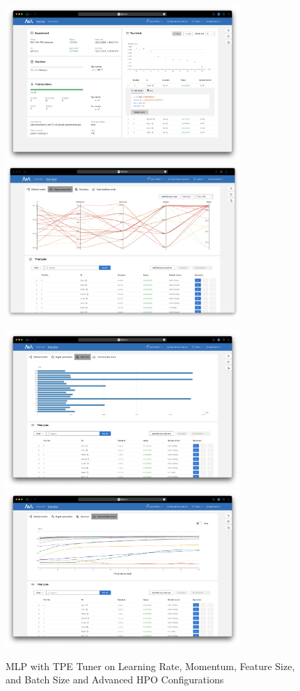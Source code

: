 \documentclass{article}
\begin{document}
\begin{figure}
	\centerline{\includegraphics[width=3.5in]{../proj3/figures/mlp_tpe_batch_advanced_overview.png}\includegraphics[width=3.5in]{../proj3/figures/mlp_tpe_batch_advanced_hyperparameter.png}}
	\centerline{\includegraphics[width=3.5in]{../proj3/figures/mlp_tpe_batch_advanced_latency.png}\includegraphics[width=3.5in]{../proj3/figures/mlp_tpe_batch_advanced_intermediate.png}}
	\caption{MLP with TPE Tuner on Learning Rate, Momentum, Feature Size, and Batch Size and Advanced HPO Configurations}
	\label{fig:mlp-tpe-batch-advanced}
\end{figure}
\end{document}
